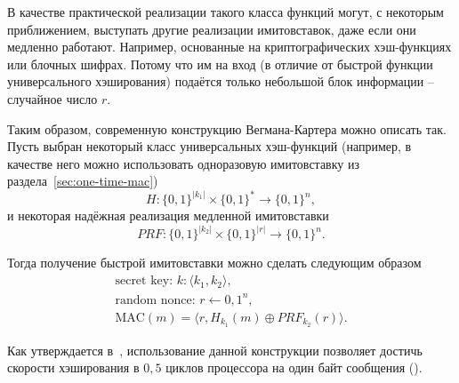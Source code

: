 В качестве практической реализации такого класса функций могут, с некоторым приближением, выступать другие реализации имитовставок, даже если они медленно работают. Например, основанные на криптографических хэш-функциях или блочных шифрах. Потому что им на вход (в отличие от быстрой функции универсального хэширования) подаётся только небольшой блок информации -- случайное число $r$.

Таким образом, современную конструкцию Вегмана-Картера можно описать так. Пусть выбран некоторый класс универсальных хэш-функций (например, в качестве него можно использовать одноразовую имитовставку из раздела~\ref{sec:one-time-mac}) \[
    H: \{0,1\}^{|k_1|} \times \{0,1\}^* \to \{0,1\}^n,
\] и некоторая надёжная реализация медленной имитовставки \[
    PRF: \{0,1\}^{|k_2|} \times \{0,1\}^{|r|} \to \{0,1\}^n.
\]

Тогда получение быстрой имитовставки можно сделать следующим образом
\[ \begin{array}{l}
\textrm{secret key: } k: \langle k_1, k_2 \rangle,\\
\textrm{random nonce: } r \leftarrow {0,1}^n,\\
\textrm{MAC} (m) = \langle r, H_{k_1}(m) \oplus PRF_{k_2}(r) \rangle.
\end{array} \]

Как утверждается в~\cite{Krovetz:2000}, использование данной конструкции позволяет достичь скорости хэширования в $0{,}5$ циклов процессора на один байт сообщения ().

